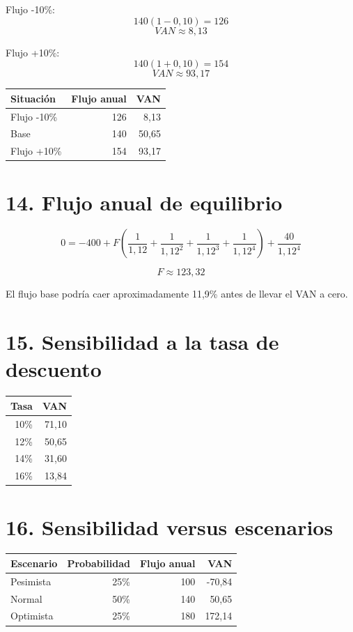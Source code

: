 \documentclass[11pt,a4paper]{article}
\begin{document}
Flujo -10\%:
\[
140(1-0{,}10)=126
\]
\[
VAN\approx 8{,}13
\]

Flujo +10\%:
\[
140(1+0{,}10)=154
\]
\[
VAN\approx 93{,}17
\]

\begin{center}
\begin{tabular}{lrr}
\toprule
\textbf{Situación} & \textbf{Flujo anual} & \textbf{VAN}\\
\midrule
Flujo -10\% & 126 & 8,13\\
Base & 140 & 50,65\\
Flujo +10\% & 154 & 93,17\\
\bottomrule
\end{tabular}
\end{center}

\section*{14. Flujo anual de equilibrio}

\[
0=-400+F\left(\frac{1}{1{,}12}+\frac{1}{1{,}12^2}+\frac{1}{1{,}12^3}+\frac{1}{1{,}12^4}\right)+\frac{40}{1{,}12^4}
\]

\[
F\approx \boxed{123{,}32}
\]

El flujo base podría caer aproximadamente 11,9\% antes de llevar el VAN a cero.

\section*{15. Sensibilidad a la tasa de descuento}

\begin{center}
\begin{tabular}{rr}
\toprule
\textbf{Tasa} & \textbf{VAN}\\
\midrule
10\% & 71,10\\
12\% & 50,65\\
14\% & 31,60\\
16\% & 13,84\\
\bottomrule
\end{tabular}
\end{center}

\section*{16. Sensibilidad versus escenarios}

\begin{center}
\begin{tabular}{lrrr}
\toprule
\textbf{Escenario} & \textbf{Probabilidad} & \textbf{Flujo anual} & \textbf{VAN}\\
\midrule
Pesimista & 25\% & 100 & -70,84\\
Normal & 50\% & 140 & 50,65\\
Optimista & 25\% & 180 & 172,14\\
\bottomrule
\end{tabular}
\end{center}
\end{document}
